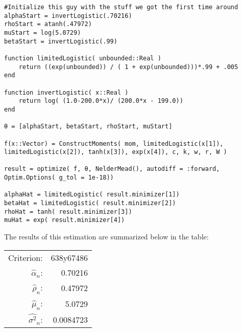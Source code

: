 \documentclass[12pt]{paper}
\newcommand{\est}[2][n]{ \widehat{ #2 }_{#1}}
\begin{document}
\begin{verbatim}
#Initialize this guy with the stuff we got the first time around
alphaStart = invertLogistic(.70216)
rhoStart = atanh(.47972)
muStart = log(5.0729)
betaStart = invertLogistic(.99)

function limitedLogistic( unbounded::Real )
    return ((exp(unbounded)) / ( 1 + exp(unbounded)))*.99 + .005
end

function invertLogistic( x::Real )
    return log( (1.0-200.0*x)/ (200.0*x - 199.0))
end

θ = [alphaStart, betaStart, rhoStart, muStart]

f(x::Vector) = ConstructMoments( mom, limitedLogistic(x[1]), limitedLogistic(x[2]), tanh(x[3]), exp(x[4]), c, k, w, r, W )

result = optimize( f, θ, NelderMead(), autodiff = :forward, Optim.Options( g_tol = 1e-18))

alphaHat = limitedLogistic( result.minimizer[1])
betaHat = limitedLogistic( result.minimizer[2])
rhoHat = tanh( result.minimizer[3])
muHat = exp( result.minimizer[4])
\end{verbatim}

The results of this estimation are summarized below in the table:

\begin{center}
  \begin{tabular}{rr}
    Criterion: & 638y67486\\
\(\est{\alpha}\): & 0.70216\\
\(\est{\rho}\): & 0.47972\\
\(\est{\mu}\): & 5.0729\\
\(\est{\sigma^{2}}\): & 0.0084723\\
\end{tabular}
\end{center}
\end{document}

